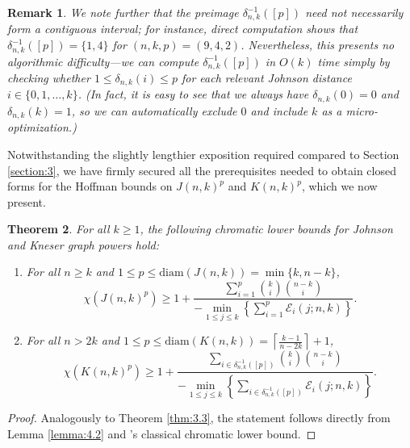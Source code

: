 \documentclass{article}
\def\Ein{\mathcal{E}}
\numberwithin{equation}{section}
\theoremstyle{plain}
\newtheorem{theorem}{Theorem}[section]
\newtheorem{remark}[theorem]{Remark}
\begin{document}
\begin{remark}\label{remark:4.4}
    We note further that the preimage $\delta_{n,k}^{-1}([p])$ need not necessarily form a contiguous interval; for instance, direct computation shows that $\delta_{n,k}^{-1}([p]) = \{1, 4\}$ for $(n, k, p) = (9, 4, 2)$. Nevertheless, this presents no algorithmic difficulty---we can compute $\delta_{n,k}^{-1}([p])$ in $O(k)$ time simply by checking whether $1 \le \delta_{n,k}(i) \le p$ for each relevant Johnson distance $i \in \{0, 1, \ldots, k\}$. (In fact, it is easy to see that we always have $\delta_{n,k}(0) = 0$ and $\delta_{n,k}(k) = 1$, so we can automatically exclude $0$ and include $k$ as a micro-optimization.)
\end{remark}

Notwithstanding the slightly lengthier exposition required compared to Section \ref{section:3}, we have firmly secured all the prerequisites needed to obtain closed forms for the Hoffman bounds on $J(n, k)^p$ and $K(n, k)^p$, which we now present.

\begin{theorem}\label{thm:4.5}
    For all $k \ge 1$, the following chromatic lower bounds for Johnson and Kneser graph powers hold:
    \begin{enumerate}[label=(\roman*)]
        \item For all $n \ge k$ and $1 \le p \le \mathrm{diam}(J(n, k)) = \min\{k, n - k\}$,
        \[\chi(J(n, k)^p) \geq 1 + \dfrac{\sum_{i = 1}^p \binom{k}{i} \binom{n - k}{i}}{-\min\limits_{1 \le j \le k}\left\{\sum_{i = 1}^p \Ein_i(j; n, k)\right\}}.\]
        \item For all $n > 2k$ and $1 \le p \le \mathrm{diam}(K(n, k)) = \left\lceil\frac{k - 1}{n - 2k}\right\rceil + 1$,
        \[\chi(K(n, k)^p) \geq 1 + \dfrac{\sum_{i \in \delta_{n,k}^{-1}([p])} \binom{k}{i} \binom{n - k}{i}}{-\min\limits_{1 \le j \le k}\left\{\sum_{i \in \delta_{n,k}^{-1}([p])} \Ein_i(j; n, k)\right\}}.\]
    \end{enumerate}
\end{theorem}

\begin{proof}
    Analogously to Theorem \ref{thm:3.3}, the statement follows directly from Lemma \ref{lemma:4.2} and \cite{Hof03}'s classical chromatic lower bound.
\end{proof}
\end{document}
